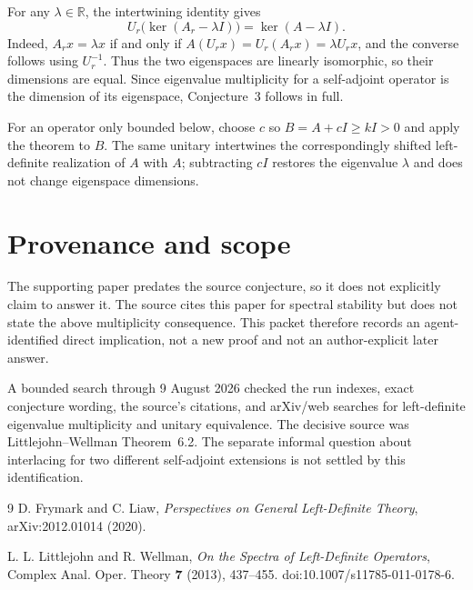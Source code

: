 \documentclass[11pt]{article}
\begin{document}
For any $\lambda\in\mathbb R$, the intertwining identity gives
\[
 U_r\bigl(\ker(A_r-\lambda I)\bigr)
   =\ker(A-\lambda I).
\]
Indeed, $A_r x=\lambda x$ if and only if
$A(U_rx)=U_r(A_rx)=\lambda U_rx$, and the converse follows using $U_r^{-1}$.
Thus the two eigenspaces are linearly isomorphic, so their dimensions are
equal.  Since eigenvalue multiplicity for a self-adjoint operator is the
dimension of its eigenspace, Conjecture~3 follows in full.

For an operator only bounded below, choose $c$ so $B=A+cI\geq kI>0$ and apply
the theorem to $B$.  The same unitary intertwines the correspondingly shifted
left-definite realization of $A$ with $A$; subtracting $cI$ restores the
eigenvalue $\lambda$ and does not change eigenspace dimensions.

\section*{Provenance and scope}

The supporting paper predates the source conjecture, so it does not explicitly
claim to answer it.  The source cites this paper for spectral stability but
does not state the above multiplicity consequence.  This packet therefore
records an agent-identified direct implication, not a new proof and not an
author-explicit later answer.

A bounded search through 9 August 2026 checked the run indexes, exact
conjecture wording, the source's citations, and arXiv/web searches for
left-definite eigenvalue multiplicity and unitary equivalence.  The decisive
source was Littlejohn--Wellman Theorem~6.2.  The separate informal question
about interlacing for two different self-adjoint extensions is not settled by
this identification.

\begin{thebibliography}{9}
D. Frymark and C. Liaw,
\emph{Perspectives on General Left-Definite Theory},
arXiv:2012.01014 (2020).

L. L. Littlejohn and R. Wellman,
\emph{On the Spectra of Left-Definite Operators},
Complex Anal. Oper. Theory \textbf{7} (2013), 437--455.
doi:10.1007/s11785-011-0178-6.
\end{thebibliography}
\end{document}
